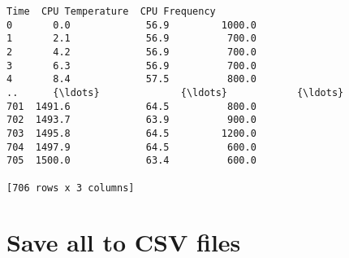 \documentclass [oneside,10pt,a4paper,ngerman,BCOR10mm,headsepline,parindent,final]{scrartcl}
\begin{document}
    
    \begin{Verbatim}[commandchars=\\\{\}]
       Time  CPU Temperature  CPU Frequency
0       0.0             56.9         1000.0
1       2.1             56.9          700.0
2       4.2             56.9          700.0
3       6.3             56.9          700.0
4       8.4             57.5          800.0
..      {\ldots}              {\ldots}            {\ldots}
701  1491.6             64.5          800.0
702  1493.7             63.9          900.0
703  1495.8             64.5         1200.0
704  1497.9             64.5          600.0
705  1500.0             63.4          600.0

[706 rows x 3 columns]
    \end{Verbatim}

    
    \hypertarget{save-all-to-csv-files}{%
\section{Save all to CSV files}\label{save-all-to-csv-files}}
\end{document}
